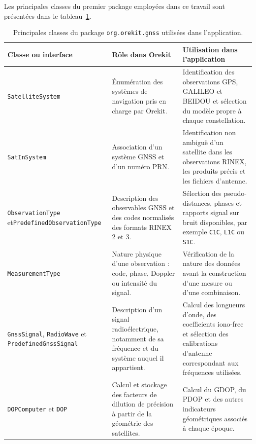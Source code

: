 Les principales classes du premier package employées dans ce travail sont
présentées dans le tableau~\ref{tab:orekit_gnss_classes}.

\begin{table}[htbp]
\centering
\small
\begin{tabularx}{\textwidth}{|>{\raggedright\arraybackslash}p{}|
                                  >{\raggedright\arraybackslash}p{}|
                                  >{\raggedright\arraybackslash}X|}
\hline
\textbf{Classe ou interface} & \textbf{Rôle dans Orekit} &
\textbf{Utilisation dans l'application} \\
\hline
\texttt{SatelliteSystem} & Énumération des systèmes de navigation pris en
charge par Orekit. & Identification des observations GPS, GALILEO et BEIDOU et
sélection du modèle propre à chaque constellation. \\
\hline
\texttt{SatInSystem} & Association d'un système GNSS et d'un numéro PRN. &
Identification non ambiguë d'un satellite dans les observations RINEX, les
produits précis et les fichiers d'antenne. \\
\hline
\texttt{ObservationType} et\newline \texttt{PredefinedObservationType} & Description
des observables GNSS et des codes normalisés des formats RINEX 2 et 3. &
Sélection des pseudo-distances, phases et rapports signal sur bruit disponibles,
par exemple \texttt{C1C}, \texttt{L1C} ou \texttt{S1C}. \\
\hline
\texttt{MeasurementType} & Nature physique d'une observation : code, phase,
Doppler ou intensité du signal. & Vérification de la nature des données avant
la construction d'une mesure ou d'une combinaison. \\
\hline
\texttt{GnssSignal}, \texttt{RadioWave} et
\texttt{PredefinedGnssSignal} & Description d'un signal radioélectrique,
notamment de sa fréquence et du système auquel il appartient. & Calcul des
longueurs d'onde, des coefficients iono-free et sélection des
calibrations d'antenne correspondant aux fréquences utilisées. \\
\hline
\texttt{DOPComputer} et \texttt{DOP} & Calcul et stockage des facteurs de
dilution de précision à partir de la géométrie des satellites. & Calcul du
GDOP, du PDOP et des autres indicateurs géométriques associés à chaque époque. \\
\hline
\end{tabularx}
\caption{Principales classes du package \texttt{org.orekit.gnss} utilisées
dans l'application.}
\label{tab:orekit_gnss_classes}
\end{table}

